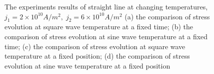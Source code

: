 \begin{figure}[!h]
\centering
{}
\caption{The experiments results of straight line at changing temperatures, $j_1=2\times10^{10}A/m^2,\;j_2=6\times10^{10}A/m^2$ (a) the comparison of stress evolution at square wave temperature at a fixed time; (b) the comparison of stress evolution at sine wave temperature at a fixed time; (c) the comparison of stress evolution at square wave temperature at a fixed position; (d) the comparison of stress evolution at sine wave temperature at a fixed position}
\label{fig:S4Results2}
\end{figure}


